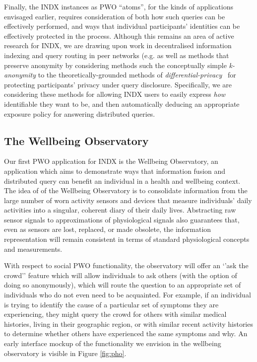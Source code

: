 \documentclass{sig-alternate}
\begin{document}
Finally, the INDX instances as PWO ``atoms'', for the kinds of applications envisaged earlier, requires consideration of both how such queries can be effectively performed, and ways that individual participants' identities can be effectively protected in the process.  Although this remains an area of active research for INDX, we are drawing upon work in decentralised information indexing and query routing in peer networks (e.g. \cite{cudre2007gridvine,tatarinov2003piazza} as well as methods that preserve anonymity by considering methods such the conceptually simple \emph{k-anonymity} \cite{sweeney2002k} to the theoretically-grounded methods of \emph{differential-privacy}~\cite{dwork2006differential} for protecting participants' privacy under query disclosure. Specifically, we are considering these methods for allowing INDX users to easily express \emph{how} identifiable they want to be, and then automatically deducing an appropriate exposure policy for answering distributed queries.  



\subsection{The Wellbeing Observatory}

Our first PWO application for INDX is the Wellbeing Observatory, an application which aims to demonstrate ways that information fusion and distributed query can benefit an individual in a health and wellbeing context. The idea of of the Wellbeing Observatory is to consolidate information from the large number of worn activity sensors and devices that measure individuals' daily activities into a singular, coherent diary of their daily lives.  Abstracting raw sensor signals to approximations of physiological signals also guarantees that, even as sensors are lost, replaced, or made obsolete, the information representation will remain consistent in terms of standard physiological concepts and measurements.

With respect to social PWO functionality, the observatory will offer an `'ask the crowd'' feature which will allow individuals to ask others (with the option of doing so anonymously), which will route the question to an appropriate set of individuals who do not even need to be acquainted.  For example, if an individual is trying to identify the cause of a particular set of symptoms they are experiencing, they might query the crowd for others with similar medical histories, living in their geographic region, or with similar recent activity histories to determine whether others have experienced the same symptoms and why.  An early interface mockup of the functionality we envision in the wellbeing observatory is visible in Figure \ref{fig:pho}.
\end{document}
